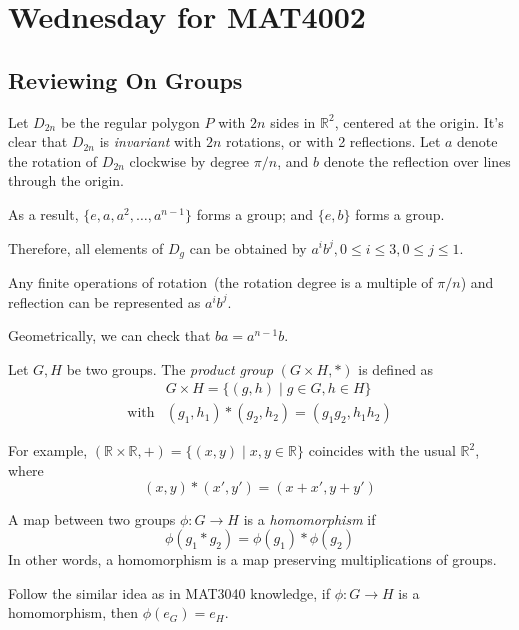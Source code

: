 \section{Wednesday for MAT4002}
\subsection{Reviewing On Groups}
\begin{example}
Let $D_{2n}$ be the regular polygon $P$ with $2n$ sides in $\mathbb{R}^2$, centered at the origin.
It's clear that $D_{2n}$ is \emph{invariant} with $2n$ rotations, or with 2 reflections.
Let $a$ denote the rotation of $D_{2n}$ clockwise by degree $\pi/n$, and $b$ denote the reflection over lines through the origin.

As a result, $\{e,a,a^2,\dots,a^{n-1}\}$ forms a group; and $\{e,b\}$ forms a group.

Therefore, all elements of $D_g$ can be obtained by $a^ib^j, 0\le i\le 3, 0\le j\le 1$.

Any finite operations of rotation~(the rotation degree is a multiple of $\pi/n$) and reflection can be represented as $a^ib^j$.

Geometrically, we can check that $ba = a^{n-1}b$. 
\end{example}

\begin{definition}
Let $G,H$ be two groups. The \emph{product group} $(G\times H,*)$ is defined as
\[
\begin{array}{ll}
&G\times H=\{(g,h)\mid g\in G,h\in H\}\\\text{with}&(g_1,h_1)*(g_2,h_2)=(g_1g_2,h_1h_2)
\end{array}
\]
\end{definition}


For example, $(\mathbb{R}\times\mathbb{R},+)=\{(x,y)\mid x,y\in\mathbb{R}\}$ coincides with the usual $\mathbb{R}^2$, where 
\[
(x,y)*(x',y')=(x+x',y+y')
\] 
\begin{definition}
A map between two groups $\phi:G\to H$ is a \emph{homomorphism} if
\[
\phi(g_1*g_2)=\phi(g_1)*\phi(g_2)
\]
In other words, a homomorphism is a map preserving multiplications of groups.
\end{definition}
\begin{remark}
Follow the similar idea as in MAT3040 knowledge, if $\phi:G\to H$ is a homomorphism, then $\phi(e_G) = e_H$.
\end{remark}

